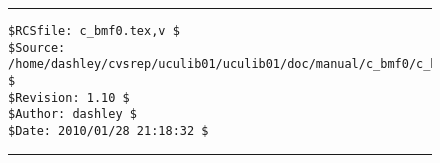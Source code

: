 \noindent\begin{figure}[!b]
\noindent\rule[-0.25in]{\textwidth}{1pt}
\begin{tiny}
\begin{verbatim}
$RCSfile: c_bmf0.tex,v $
$Source: /home/dashley/cvsrep/uculib01/uculib01/doc/manual/c_bmf0/c_bmf0.tex,v $
$Revision: 1.10 $
$Author: dashley $
$Date: 2010/01/28 21:18:32 $
\end{verbatim}
\end{tiny}
\noindent\rule[0.25in]{\textwidth}{1pt}
\end{figure}

%
%
%
%
%
%
%
%
%
%

